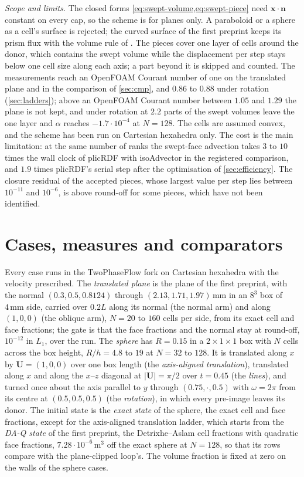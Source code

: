 \documentclass[preprint,12pt]{elsarticle}
\newcommand{\x}{\mathbf{x}}
\newcommand{\n}{\mathbf{n}}
\begin{document}
\emph{Scope and limits.} The closed forms \cref{eq:swept-volume,eq:swept-piece} need $\x\cdot\n$ constant on every cap, so the scheme is for planes only. A paraboloid or a sphere as a cell's surface is rejected; the curved surface of the first preprint keeps its prism flux with the volume rule of \citet{KromerBothe2023Init}. The pieces cover one layer of cells around the donor, which contains the swept volume while the displacement per step stays below one cell size along each axis; a part beyond it is skipped and counted. The measurements reach an OpenFOAM Courant number of one on the translated plane and in the comparison of \cref{sec:cmp}, and $0.86$ to $0.88$ under rotation (\cref{sec:ladders}); above an OpenFOAM Courant number between $1.05$ and $1.29$ the plane is not kept, and under rotation at $2.2$ parts of the swept volumes leave the one layer and $\alpha$ reaches $-1.7\cdot10^{-4}$ at $N = 128$. The cells are assumed convex, and the scheme has been run on Cartesian hexahedra only. The cost is the main limitation: at the same number of ranks the swept-face advection takes $3$ to $10$ times the wall clock of plicRDF with isoAdvector in the registered comparison, and $1.9$ times plicRDF's serial step after the optimisation of \cref{sec:efficiency}. The closure residual of the accepted pieces, whose largest value per step lies between $10^{-11}$ and $10^{-6}$, is above round-off for some pieces, which have not been identified.

\section{Cases, measures and comparators}
\label{sec:cases}

Every case runs in the TwoPhaseFlow fork on Cartesian hexahedra with the velocity prescribed. The \emph{translated plane} is the plane of the first preprint, with the normal $(0.3, 0.5, 0.8124)$ through $(2.13, 1.71, 1.97)\,\mathrm{mm}$ in an $8^3$ box of $4\,\mathrm{mm}$ side, carried over $0.2L$ along its normal (the normal arm) and along $(1, 0, 0)$ (the oblique arm), $N = 20$ to $160$ cells per side, from its exact cell and face fractions; the gate is that the face fractions and the normal stay at round-off, $10^{-12}$ in $L_1$, over the run. The \emph{sphere} has $R = 0.15$ in a $2 \times 1 \times 1$ box with $N$ cells across the box height, $R/h = 4.8$ to $19$ at $N = 32$ to $128$. It is translated along $x$ by $\mathbf{U} = (1, 0, 0)$ over one box length (the \emph{axis-aligned translation}), translated along $x$ and along the $x$--$z$ diagonal at $|\mathbf{U}| = \pi/2$ over $t = 0.45$ (the \emph{lines}), and turned once about the axis parallel to $y$ through $(0.75, \cdot, 0.5)$ with $\omega = 2\pi$ from its centre at $(0.5, 0.5, 0.5)$ (the \emph{rotation}), in which every pre-image leaves its donor. The initial state is the \emph{exact state} of the sphere, the exact cell and face fractions, except for the axis-aligned translation ladder, which starts from the \emph{DA-Q state} of the first preprint, the Detrixhe--Aslam cell fractions with quadratic face fractions, $7.28\cdot10^{-6}\,\mathrm{m^3}$ off the exact sphere at $N = 128$, so that its rows compare with the plane-clipped loop's. The volume fraction is fixed at zero on the walls of the sphere cases.
\end{document}
